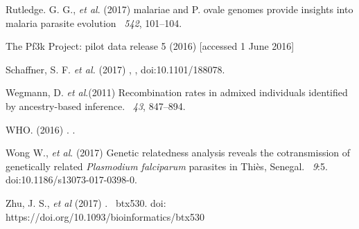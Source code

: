 \documentclass{article}
\begin{document}
\begin{thebibliography}{}
Rutledge. G. G., {\em et al}. (2017)
 malariae and P. ovale genomes provide insights into malaria parasite evolution
~{\em 542}, 101--104.


The Pf3k Project: pilot data release 5 (2016)
 [accessed 1 June 2016]


Schaffner, S. F. {\em et al.} (2017)
,
, doi:10.1101/188078.

Wegmann, D. {\em et al}.(2011)
\newblock Recombination rates in admixed individuals identified by ancestry-based inference.
~{\em 43\/}, 847--894.

WHO. (2016)
.
.

Wong W., {\em et al}. (2017)
\newblock Genetic relatedness analysis reveals the cotransmission of genetically related {\it Plasmodium falciparum} parasites in Thiès, Senegal.
~{\em 9}:5. doi:10.1186/s13073-017-0398-0.

Zhu, J. S., {\em et al} (2017)
.
~{\em \/}btx530. doi: https://doi.org/10.1093/bioinformatics/btx530

\end{thebibliography}
\end{document}
